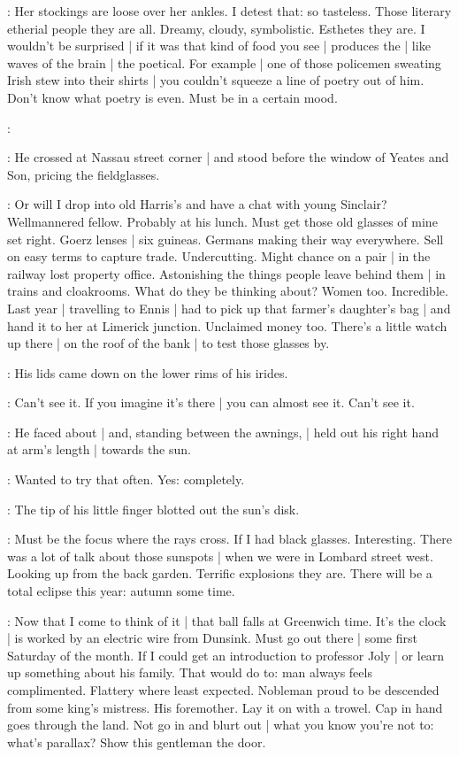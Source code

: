 \BloomInt:
Her stockings are loose over her ankles.
I detest that:
so tasteless.
Those literary etherial people they are all.
Dreamy,
cloudy,
symbolistic.
Esthetes they are.
I wouldn't be surprised |
if it was that kind of food you see |
produces the |
like waves of the brain |
the poetical.
For example |
one of those policemen sweating Irish stew into their shirts |
you couldn't squeeze a line of poetry out of him.
Don't know what poetry is even.
Must be in a certain mood.

\BloomInt:
%

:
He crossed at Nassau street corner |
and stood before the window of Yeates and Son,
pricing the fieldglasses.

\BloomInt:
Or will I drop into old Harris's
and have a chat with young Sinclair?
Wellmannered fellow.
Probably at his lunch.
Must get those old glasses of mine set right.
Goerz lenses |
six guineas.
Germans making their way everywhere.
Sell on easy terms to capture trade.
Undercutting.
Might chance on a pair |
in the railway lost property office.
Astonishing the things people leave behind them |
in trains and cloakrooms.
What do they be thinking about?
Women too.
Incredible.
Last year |
travelling to Ennis |
had to pick up that farmer's daughter's bag |
and hand it to her at Limerick junction.
Unclaimed money too.
There's a little watch up there |
on the roof of the bank |
to test those glasses by.

:
His lids came down on the lower rims of his irides.

\BloomInt:
Can't see it.
If you imagine it's there |
you can almost see it.
Can't see it.

:
He faced about |
and, standing between the awnings, |
held out his right hand at arm's length |
towards the sun.

\BloomInt:
Wanted to try that often.
Yes:
completely.

:
The tip of his little finger blotted out the sun's disk.

\BloomInt:
Must be the focus where the rays cross.
If I had black glasses.
Interesting.
There was a lot of talk about those sunspots |
when we were in Lombard street west.
Looking up from the back garden.
Terrific explosions they are.
There will be a total eclipse this year:
autumn some time.

\BloomInt:
Now that I come to think of it |
that ball falls at Greenwich time.
It's the clock |
is worked by an electric wire from Dunsink.
Must go out there |
some first Saturday of the month.
If I could get an introduction to professor Joly |
or learn up something about his family.
That would do to:
man always feels complimented.
Flattery where least expected.
Nobleman proud to be descended from some king's mistress.
His foremother.
Lay it on with a trowel.
Cap in hand goes through the land.
Not go in and blurt out |
what you know you're not to:
what's parallax?
Show this gentleman the door.

